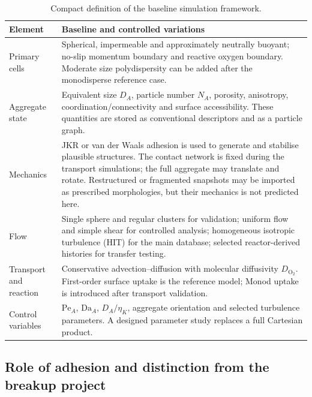 \documentclass[11pt,a4paper]{article}
\newcommand{\Pe}{\mathrm{Pe}}
\newcommand{\Da}{\mathrm{Da}}
\newcommand{\Otwo}{\mathrm{O}_2}
\begin{document}
\begin{table}[htbp]
\centering
\caption{Compact definition of the baseline simulation framework.}
\label{tab:framework}
\small
\begin{tabular}{>{\raggedright\arraybackslash}p{}
                >{\raggedright\arraybackslash}p{}}
\toprule
\textbf{Element} & \textbf{Baseline and controlled variations}\\
\midrule
Primary cells &
Spherical, impermeable and approximately neutrally buoyant; no-slip momentum
boundary and reactive oxygen boundary. Moderate size polydispersity can be
added after the monodisperse reference case.\\

Aggregate state &
Equivalent size \(D_A\), particle number \(N_A\), porosity, anisotropy,
coordination/connectivity and surface accessibility. These quantities are
stored as conventional descriptors and as a particle graph.\\

Mechanics &
JKR or van der Waals adhesion is used to generate and stabilise plausible
structures. The contact network is fixed during the transport simulations;
the full aggregate may translate and rotate. Restructured or fragmented
snapshots may be imported as prescribed morphologies, but their mechanics is
not predicted here.\\

Flow &
Single sphere and regular clusters for validation; uniform flow and simple
shear for controlled analysis; homogeneous isotropic turbulence (HIT) for the
main database; selected reactor-derived histories for transfer testing.\\

Transport and reaction &
Conservative advection--diffusion with molecular diffusivity \(D_{\Otwo}\).
First-order surface uptake is the reference model; Monod uptake is introduced
after transport validation.\\

Control variables &
\(\Pe_A\), \(\Da_A\), \(D_A/\eta_K\), aggregate orientation and selected
turbulence parameters. A designed parameter study replaces a full Cartesian
product.\\
\bottomrule
\end{tabular}
\end{table}

\subsection{Role of adhesion and distinction from the breakup project}
\end{document}
